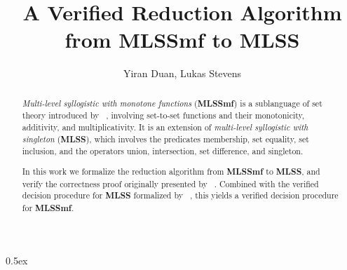 \documentclass[11pt,a4paper]{article}
\newcommand{\mlss}{\textbf{MLSS}}
\newcommand{\mlssmf}{\textbf{MLSSmf}}
\begin{document}
\title{A Verified Reduction Algorithm from MLSSmf to MLSS}
\author{Yiran Duan, Lukas Stevens}
\maketitle

\begin{abstract}
\textit{Multi-level syllogistic with monotone functions} (\mlssmf{}) is a sublanguage of set theory introduced by \citeauthor{mlssmf_II}~\cite{mlssmf_II}, 
involving set-to-set functions and their monotonicity, additivity, and multiplicativity. It is an extension of \textit{multi-level syllogistic with singleton} (\mlss{}), which involves the predicates membership, set equality, set inclusion, and the operators union, intersection, set difference, and singleton.

In this work we formalize the reduction algorithm from \mlssmf{} 
to \mlss{}, and verify the correctness proof originally presented by \citeauthor{mlssmf_II}~\cite{mlssmf_II}. Combined with the verified decision procedure for \mlss{} formalized by \citeauthor{MLSS_Decision_Proc-AFP}~\cite{MLSS_Decision_Proc-AFP}, this yields a verified decision procedure for \mlssmf{}.
\end{abstract}

\newpage

\parindent 0pt\parskip 0.5ex



\nocite{*}


\end{document}
